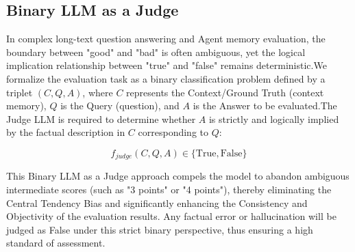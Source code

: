\subsection{Binary LLM as a Judge}

In complex long-text question answering and Agent memory evaluation, the boundary between "good" and "bad" is often ambiguous, yet the logical implication relationship between "true" and "false" remains deterministic.We formalize the evaluation task as a binary classification problem defined by a triplet $(C, Q, A)$, where $C$ represents the Context/Ground Truth (context memory), $Q$ is the Query (question), and $A$ is the Answer to be evaluated.The Judge LLM is required to determine whether $A$ is strictly and logically implied by the factual description in $C$ corresponding to $Q$:

$$
f_{judge}(C, Q, A) \in \{\text{True}, \text{False}\}
$$

This Binary LLM as a Judge approach compels the model to abandon ambiguous intermediate scores (such as "3 points" or "4 points"), thereby eliminating the Central Tendency Bias and significantly enhancing the Consistency and Objectivity of the evaluation results. Any factual error or hallucination will be judged as False under this strict binary perspective, thus ensuring a high standard of assessment.

